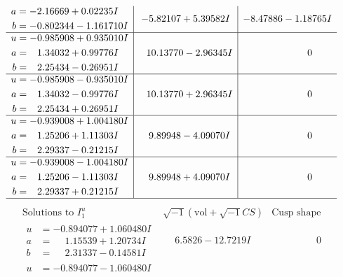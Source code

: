 \documentclass[1p]{elsarticle_modified}
\theoremstyle{definition}
\newcommand{\I}{\sqrt{-1}}
\begin{document}
$$\begin{array}{c|c|c}
\begin{aligned}
a &= -2.16669 + 0.02235 I \\
b &= -0.802344 - 1.161710 I\end{aligned}
 & -5.82107 + 5.39582 I & -8.47886 - 1.18765 I \\ \hline\begin{aligned}
u &= -0.985908 + 0.935010 I \\
a &= \phantom{-}1.34032 + 0.99776 I \\
b &= \phantom{-}2.25434 - 0.26951 I\end{aligned}
 & \phantom{-}10.13770 - 2.96345 I & \phantom{-0.000000 } 0 \\ \hline\begin{aligned}
u &= -0.985908 - 0.935010 I \\
a &= \phantom{-}1.34032 - 0.99776 I \\
b &= \phantom{-}2.25434 + 0.26951 I\end{aligned}
 & \phantom{-}10.13770 + 2.96345 I & \phantom{-0.000000 } 0 \\ \hline\begin{aligned}
u &= -0.939008 + 1.004180 I \\
a &= \phantom{-}1.25206 + 1.11303 I \\
b &= \phantom{-}2.29337 - 0.21215 I\end{aligned}
 & \phantom{-}9.89948 - 4.09070 I & \phantom{-0.000000 } 0 \\ \hline\begin{aligned}
u &= -0.939008 - 1.004180 I \\
a &= \phantom{-}1.25206 - 1.11303 I \\
b &= \phantom{-}2.29337 + 0.21215 I\end{aligned}
 & \phantom{-}9.89948 + 4.09070 I & \phantom{-0.000000 } 0\\
 \hline 
 \end{array}$$\newpage$$\begin{array}{c|c|c}  
\text{Solutions to }I^u_{1}& \I (\text{vol} + \sqrt{-1}CS) & \text{Cusp shape}\\
 \hline 
\begin{aligned}
u &= -0.894077 + 1.060480 I \\
a &= \phantom{-}1.15539 + 1.20734 I \\
b &= \phantom{-}2.31337 - 0.14581 I\end{aligned}
 & \phantom{-}6.5826 - 12.7219 I & \phantom{-0.000000 } 0 \\ \hline\begin{aligned}
u &= -0.894077 - 1.060480 I \\

\end{aligned}
\end{array}$$
\end{document}
